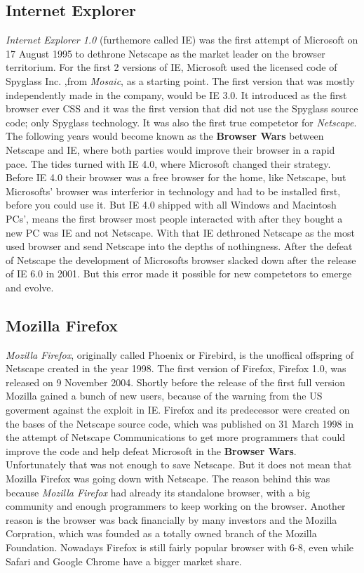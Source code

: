 \documentclass[runningheads]{llncs}
\begin{document}
		\subsection{Internet Explorer}
		\textit{Internet Explorer 1.0} (furthemore called IE) was the first attempt of Microsoft on 17 August 1995 to dethrone Netscape as the market leader on the browser territorium. For the first 2 versions of IE, Microsoft used the licensed code of Spyglass Inc. ,from \textit{Mosaic}, as a starting point. The first version that was mostly independently made in the company, would be IE 3.0. It introduced as the first browser ever CSS and it was the first version that did not use the Spyglass source code; only Spyglass technology. It was also the first true competetor for \textit{Netscape}. The following years would become known as the \textbf{Browser Wars} between Netscape and IE, where both parties would improve their browser in a rapid pace. The tides turned with IE 4.0, where Microsoft changed their strategy. Before IE 4.0 their browser was a free browser for the home, like Netscape, but Microsofts' browser was interferior in technology and had to be installed first, before you could use it. But IE 4.0 shipped with all Windows and Macintosh PCs', means the first browser most people interacted with after they bought a new PC was IE and not Netscape. With that IE dethroned Netscape as the most used browser and send Netscape into the depths of nothingness. After the defeat of Netscape the development of Microsofts browser slacked down after the release of IE 6.0 in 2001. But this error made it possible for new competetors to emerge and evolve.
		\subsection{Mozilla Firefox}
		\textit{Mozilla Firefox}, originally called Phoenix or Firebird, is the unoffical offspring of Netscape created in the year 1998. The first version of Firefox, Firefox 1.0, was released on 9 November 2004. Shortly before the release of the first full version Mozilla gained a bunch of new users, because of the warning from the US goverment against the exploit in IE. Firefox and its predecessor were created on the bases of the Netscape source code, which was published on 31 March 1998 in the attempt of Netscape Communications to get more programmers that could improve the code and help defeat Microsoft in the \textbf{Browser Wars}. Unfortunately that was not enough to save Netscape. But it does not mean that Mozilla Firefox was going down with Netscape. The reason behind this was because \textit{Mozilla Firefox} had already its standalone browser, with a big community and enough  programmers  to keep working on the browser. Another reason is the browser was back financially by many investors and the Mozilla Corpration, which was founded as a totally owned branch of the Mozilla Foundation. Nowadays Firefox is still fairly popular browser with 6-8, even while Safari and Google Chrome have a bigger market share.
\end{document}
